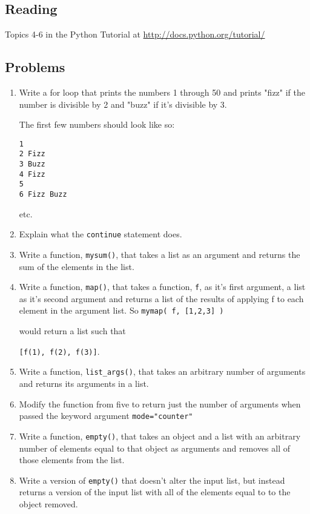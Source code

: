 \documentclass{report}
\begin{document}
\subsection{Reading}
Topics 4-6 in the Python Tutorial at \url{http://docs.python.org/tutorial/} \cite{website:Python272docs}
\subsection{Problems}
\begin{enumerate}
	\item Write a for loop that prints the numbers 1 through 50 and prints "fizz" if the number is divisible by 2 and "buzz" if it's divisible by 3.

The first few numbers should look like so:
\begin{verbatim}
1
2 Fizz
3 Buzz
4 Fizz
5
6 Fizz Buzz
\end{verbatim}
etc.

	\item Explain what the \verb|continue| statement does.
	\item Write a function, \verb|mysum()|, that takes a list as an argument and returns the sum of the elements in the list.
	\item Write a function, \verb|map()|, that takes a function, \verb|f|, as it's first argument, a list as it's second argument and returns a list of the results of applying f to each element in the argument list. So \verb|mymap( f, [1,2,3] )|

would return a list such that

\verb|[f(1), f(2), f(3)]|.

	\item Write a function, \verb|list_args()|, that takes an arbitrary number of arguments and returns its arguments in a list.
	\item Modify the function from five to return just the number of arguments when passed the keyword argument
\verb|mode="counter"|

	\item Write a function, \verb|empty()|, that takes an object and a list with an arbitrary number of elements equal to that object as arguments and removes all of those elements from the list.

	\item Write a version of \verb|empty()| that doesn't alter the input list, but instead returns a version of the input list with all of the elements equal to to the object removed.


\end{enumerate}
\end{document}

